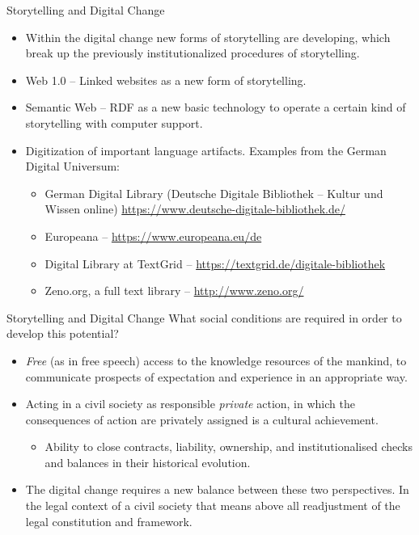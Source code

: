 \documentclass{beamer}
\begin{document}
\begin{frame}{Storytelling and Digital Change}
\begin{itemize}
\item Within the digital change new forms of storytelling are developing,
  which break up the previously institutionalized procedures of storytelling.
\item Web 1.0 -- Linked websites as a new form of storytelling.
\item Semantic Web -- RDF as a new basic technology to operate a certain kind
  of storytelling with computer support.
\item Digitization of important language artifacts. Examples from the German
  Digital Universum:
  \begin{itemize}
  \item German Digital Library (Deutsche Digitale Bibliothek – Kultur und
    Wissen online) \url{https://www.deutsche-digitale-bibliothek.de/} 
  \item Europeana – \url{https://www.europeana.eu/de}
  \item Digital Library at TextGrid –
    \url{https://textgrid.de/digitale-bibliothek}
  \item Zeno.org, a full text library – \url{http://www.zeno.org/}
  \end{itemize}
\end{itemize}\vspace*{2em}
\end{frame}

\begin{frame}{Storytelling and Digital Change}
What social conditions are required in order to develop this potential?
\begin{itemize}
\item \emph{Free} (as in free speech) access to the knowledge resources of the
  mankind, to communicate prospects of expectation and experience in an
  appropriate way.
\item Acting in a civil society as responsible \emph{private} action, in which
  the consequences of action are privately assigned is a cultural achievement.
  \begin{itemize}
  \item Ability to close contracts, liability, ownership, and
    institutionalised checks and balances in their historical evolution.
  \end{itemize}
\item The digital change requires a new balance between these two
  perspectives. In the legal context of a civil society that means above all
  readjustment of the legal constitution and framework.
\end{itemize}
\end{frame}
\end{document}
